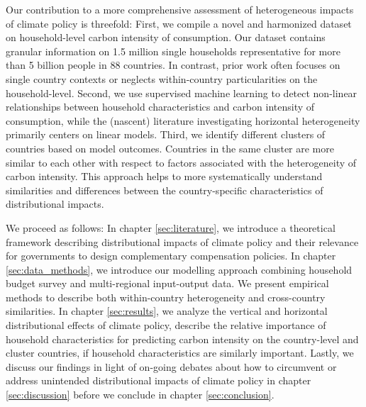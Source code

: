 \documentclass[12pt, a4paper]{article}
\begin{document}
Our contribution to a more comprehensive assessment of heterogeneous impacts of climate policy is threefold: First, we compile a novel and harmonized dataset on household-level carbon intensity of consumption. Our dataset contains granular information on 1.5 million single households representative for more than 5 billion people in 88 countries. In contrast, prior work often focuses on single country contexts or neglects within-country particularities on the household-level. Second, we use supervised machine learning to detect non-linear relationships between household characteristics and carbon intensity of consumption, while the (nascent) literature investigating horizontal heterogeneity primarily centers on linear models. Third, we identify different clusters of countries based on model outcomes. Countries in the same cluster are more similar to each other with respect to factors associated with the heterogeneity of carbon intensity. This approach helps to more systematically understand similarities and differences between the country-specific characteristics of distributional impacts. %

We proceed as follows: In chapter \ref{sec:literature}, we introduce a theoretical framework describing distributional impacts of climate policy and their relevance for governments to design complementary compensation policies. In chapter \ref{sec:data_methods}, we introduce our modelling approach combining household budget survey and multi-regional input-output data. We present empirical methods to describe both within-country heterogeneity and cross-country similarities. In chapter \ref{sec:results}, we analyze the vertical and horizontal distributional effects of climate policy, describe the relative importance of household characteristics for predicting carbon intensity on the country-level and cluster countries, if household characteristics are similarly important. Lastly, we discuss our findings in light of on-going debates about how to circumvent or address unintended distributional impacts of climate policy in chapter \ref{sec:discussion} before we conclude in chapter \ref{sec:conclusion}.  

\end{document}
